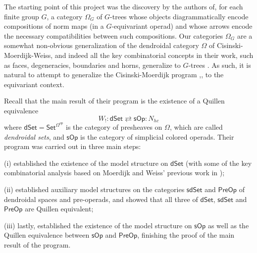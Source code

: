 \documentclass[a4paper,10pt
]{article}%
\begin{document}
The starting point of this project was the discovery by the authors of,
for each finite group $G$,
a category $\Omega_G$ of $G$-trees whose objects diagrammatically encode compositions of norm maps 
(in a $G$-equivariant operad)
and whose arrows encode the necessary compatibilities between such compositions.
Our categories $\Omega_G$ are a somewhat non-obvious  generalization of the dendroidal category $\Omega$
of Cisinski-Moerdijk-Weiss, 
and indeed all the key combinatorial concepts in their work,
such as faces, degeneracies, boundaries and horns, generalize to $G$-trees \cite[\S 5,\S 6]{Per17}.
As such, it is natural to attempt to generalize the 
Cisinski-Moerdijk program \cite{CM11},\cite{CM13a},\cite{CM13b} to the equivariant context. 

Recall that the main result of their program is the existence of a Quillen equivalence
\[
	W_{!} \colon \mathsf{dSet} 
		\rightleftarrows
	\mathsf{sOp}  \colon N_{hc} 
\]
where $\mathsf{dSet} = \mathsf{Set}^{\Omega^{op}} $
is the category of presheaves on $\Omega$, 
which are called \textit{dendroidal sets},
and 
$\mathsf{sOp}$ is the category of simplicial colored operads.
Their program was carried out in three main steps:
\begin{inparaenum}
	\item[(i)] \cite{CM11} established the existence of the model structure on $\mathsf{dSet}$
	(with some of the key combinatorial analysis based on Moerdijk and Weiss' previous work in \cite{MW09});
	\item[(ii)] \cite{CM13a} established auxiliary model structures on the categories $\mathsf{sdSet}$ and $\mathsf{PreOp}$
	of dendroidal spaces and pre-operads, and showed that all three of $\mathsf{dSet}$, $\mathsf{sdSet}$ and $\mathsf{PreOp}$ are Quillen equivalent;
	\item[(iii)] lastly, \cite{CM13b} established the existence of the model structure on $\mathsf{sOp}$ as well as the Quillen equivalence between $\mathsf{sOp}$ and $\mathsf{PreOp}$, finishing the proof of the main result of the program.
\end{inparaenum}
\end{document}
